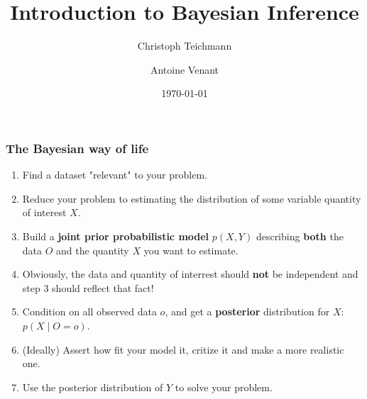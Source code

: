 \documentclass{beamer}
\begin{document}
\title{Introduction to Bayesian Inference} 
\author[Antoine Venant]{Christoph Teichmann \and Antoine Venant}
\date{\today}
\maketitle


\begin{frame}
  \frametitle{The Bayesian way of life}

    \begin{enumerate}
    \item<1-> Find a dataset "relevant" to your problem.
    \item<2-> Reduce your problem to estimating the distribution of some variable quantity of interest $X$.
    \item<3-> Build a {\bf joint prior probabilistic model} $p(X,Y)$ describing {\bf both} the data $O$ and the quantity $X$ you want to estimate.
    \item<4->[\alert{$\rightarrow$}]\alert{Obviously, the data and quantity of interrest should {\bf not} be independent and step 3 should reflect that fact!}
    \item<5-> Condition on all observed data $o$, and get a \textbf{posterior} distribution for $X$: $p(X \mid O=o)$.
    \item<6-> (Ideally) Assert how fit your model it, critize it and make a more realistic one.
    \item<7-> Use the posterior distribution of $Y$ to solve your problem.
    \end{enumerate}
\end{frame}
\end{document}
